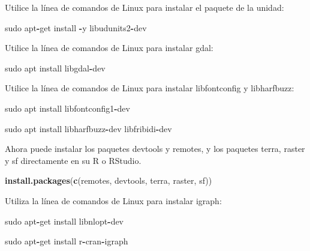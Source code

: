 \documentclass[
]{book}
\newenvironment{Shaded}{\begin{snugshade}}{\end{snugshade}}
\newcommand{\FunctionTok}[1]{\textcolor[rgb]{0.13,0.29,0.53}{\textbf{#1}}}
\newcommand{\NormalTok}[1]{#1}
\newcommand{\SpecialCharTok}[1]{\textcolor[rgb]{0.81,0.36,0.00}{\textbf{#1}}}
\newcommand{\StringTok}[1]{\textcolor[rgb]{0.31,0.60,0.02}{#1}}
\begin{document}
Utilice la línea de comandos de Linux para instalar el paquete de la
unidad:

\begin{Shaded}
\begin{Highlighting}[]
\NormalTok{sudo apt}\SpecialCharTok{{-}}\NormalTok{get install }\SpecialCharTok{{-}}\NormalTok{y libudunits2}\SpecialCharTok{{-}}\NormalTok{dev}
\end{Highlighting}
\end{Shaded}

Utilice la línea de comandos de Linux para instalar gdal:

\begin{Shaded}
\begin{Highlighting}[]
\NormalTok{sudo apt install libgdal}\SpecialCharTok{{-}}\NormalTok{dev}
\end{Highlighting}
\end{Shaded}

Utilice la línea de comandos de Linux para instalar libfontconfig y
libharfbuzz:

\begin{Shaded}
\begin{Highlighting}[]
\NormalTok{sudo apt install libfontconfig1}\SpecialCharTok{{-}}\NormalTok{dev}

\NormalTok{sudo apt install libharfbuzz}\SpecialCharTok{{-}}\NormalTok{dev libfribidi}\SpecialCharTok{{-}}\NormalTok{dev}
\end{Highlighting}
\end{Shaded}

Ahora puede instalar los paquetes devtools y remotes, y los paquetes
terra, raster y sf directamente en su R o RStudio.

\begin{Shaded}
\begin{Highlighting}[]
\FunctionTok{install.packages}\NormalTok{(}\FunctionTok{c}\NormalTok{(}\StringTok{\textquotesingle{}remotes\textquotesingle{}}\NormalTok{, }\StringTok{\textquotesingle{}devtools\textquotesingle{}}\NormalTok{, }\StringTok{\textquotesingle{}terra\textquotesingle{}}\NormalTok{, }\StringTok{\textquotesingle{}raster\textquotesingle{}}\NormalTok{, }\StringTok{\textquotesingle{}sf\textquotesingle{}}\NormalTok{))}
\end{Highlighting}
\end{Shaded}

Utiliza la línea de comandos de Linux para instalar igraph:

\begin{Shaded}
\begin{Highlighting}[]
\NormalTok{sudo apt}\SpecialCharTok{{-}}\NormalTok{get install libnlopt}\SpecialCharTok{{-}}\NormalTok{dev}

\NormalTok{sudo apt}\SpecialCharTok{{-}}\NormalTok{get install r}\SpecialCharTok{{-}}\NormalTok{cran}\SpecialCharTok{{-}}\NormalTok{igraph}
\end{Highlighting}
\end{Shaded}
\end{document}
